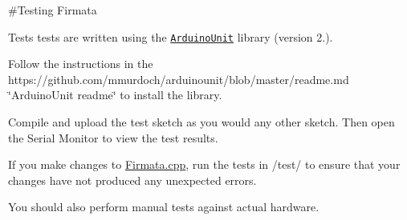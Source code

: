 \#\+Testing Firmata

Tests tests are written using the \href{https://github.com/mmurdoch/arduinounit}{\tt Arduino\+Unit} library (version 2.).

Follow the instructions in the https\+://github.com/mmurdoch/arduinounit/blob/master/readme.\+md \char`\"{}\+Arduino\+Unit readme\char`\"{} to install the library.

Compile and upload the test sketch as you would any other sketch. Then open the Serial Monitor to view the test results.

If you make changes to \hyperlink{_firmata_8cpp}{Firmata.\+cpp}, run the tests in /test/ to ensure that your changes have not produced any unexpected errors.

You should also perform manual tests against actual hardware. 